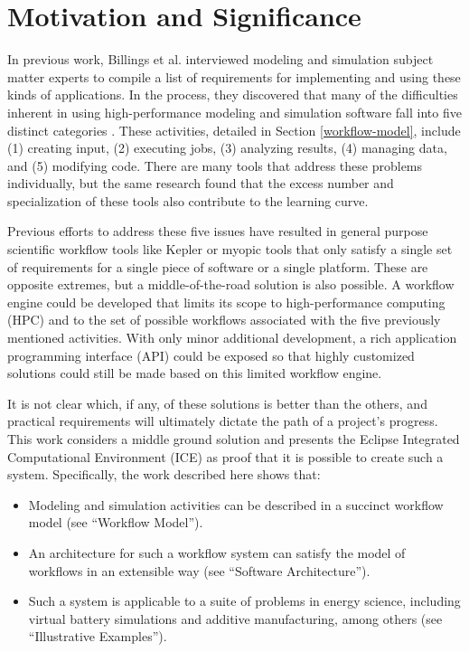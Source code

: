 \section{Motivation and Significance}\label{motivation-and-significance}

In previous work, Billings et al. interviewed modeling and simulation subject matter experts to compile a list of requirements for implementing and 
using these kinds of applications. In the process, they discovered 
that many of the difficulties inherent in using
high-performance modeling and simulation software fall into five
distinct categories \cite{billings_designing_2009}. These activities,
detailed in Section \ref{workflow-model}, include (1) creating input,
(2) executing jobs, (3) analyzing results, (4) managing data, and (5)
modifying code. There are many tools that address these problems
individually, but the same research found that the excess number and
specialization of these tools also contribute to the learning curve.

Previous efforts to address these five issues have resulted in general
purpose scientific workflow tools like Kepler \cite{ludascher_scientific_2006} 
or myopic tools that only satisfy a single
set of requirements for a single piece of software or a single platform. These
are opposite extremes, but a middle-of-the-road solution is also
possible. A workflow engine could be developed that limits its scope to
high-performance computing (HPC) and to the set of possible workflows
associated with the five previously mentioned activities. With only
minor additional development, a rich application programming interface
(API) could be exposed so that highly customized solutions could still
be made based on this limited workflow engine.

It is not clear which, if any, of these solutions is better than the
others, and practical requirements will ultimately dictate the path of a
project's progress. This work considers a middle ground solution and
presents the Eclipse Integrated Computational Environment (ICE) as proof
that it is possible to create such a system. Specifically, the work
described here shows that:

\begin{itemize}
\item
  Modeling and simulation activities can be described in a succinct
  workflow model (see ``Workflow Model'').
\item
  An architecture for such a workflow system can satisfy the model of
  workflows in an extensible way (see ``Software Architecture'').
\item
  Such a system is applicable to a suite of problems in energy science,
  including virtual battery simulations and additive manufacturing, 
  among others (see ``Illustrative Examples'').
\end{itemize}

